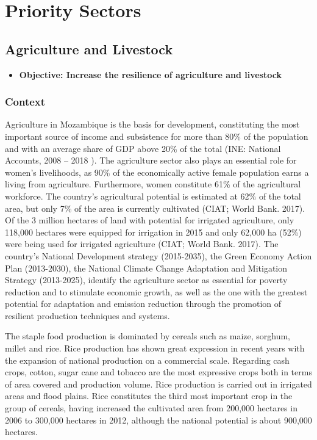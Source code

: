 \documentclass[
]{book}
\providecommand{\tightlist}{%
  \setlength{\itemsep}{0pt}\setlength{\parskip}{0pt}}
\begin{document}
\hypertarget{priority-sectors}{%
\chapter{Priority Sectors}\label{priority-sectors}}

\hypertarget{agriculture-and-livestock}{%
\section{Agriculture and Livestock}\label{agriculture-and-livestock}}

\begin{itemize}
\tightlist
\item
  \textbf{Objective: Increase the resilience of agriculture and livestock}
\end{itemize}

\hypertarget{context}{%
\subsection{Context}\label{context}}

Agriculture in Mozambique is the basis for development, constituting the most important source of income and subsistence for more than 80\% of the population and with an average share of GDP above 20\% of the total (INE: National Accounts, 2008 -- 2018 ). The agriculture sector also plays an essential role for women's livelihoods, as 90\% of the economically active female population earns a living from agriculture. Furthermore, women constitute 61\% of the agricultural workforce. The country's agricultural potential is estimated at 62\% of the total area, but only 7\% of the area is currently cultivated (CIAT; World Bank. 2017). Of the 3 million hectares of land with potential for irrigated agriculture, only 118,000 hectares were equipped for irrigation in 2015 and only 62,000 ha (52\%) were being used for irrigated agriculture (CIAT; World Bank. 2017). The country's National Development strategy (2015-2035), the Green Economy Action Plan (2013-2030), the National Climate Change Adaptation and Mitigation Strategy (2013-2025), identify the agriculture sector as essential for poverty reduction and to stimulate economic growth, as well as the one with the greatest potential for adaptation and emission reduction through the promotion of resilient production techniques and systems.

The staple food production is dominated by cereals such as maize, sorghum, millet and rice. Rice production has shown great expression in recent years with the expansion of national production on a commercial scale. Regarding cash crops, cotton, sugar cane and tobacco are the most expressive crops both in terms of area covered and production volume. Rice production is carried out in irrigated areas and flood plains. Rice constitutes the third most important crop in the group of cereals, having increased the cultivated area from 200,000 hectares in 2006 to 300,000 hectares in 2012, although the national potential is about 900,000 hectares.
\end{document}
